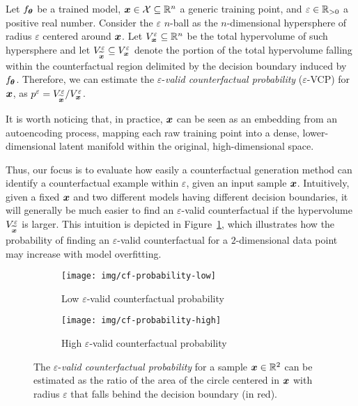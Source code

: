 \begin{definition}
Let $f_{\boldsymbol{\theta}}$ be a trained model, $\boldsymbol{x} \in \mathcal{X}\subseteq \mathbb{R}^n$ a generic training point, and $\varepsilon \in \mathbb{R}_{>0}$ a positive real number. Consider the $\varepsilon$ $n$-ball as the $n$-dimensional hypersphere of radius $\varepsilon$ centered around $\boldsymbol{x}$. Let $V_{\boldsymbol{x}}^{\varepsilon}\subseteq \mathbb{R}^n$ be the total hypervolume of such hypersphere and let $V_{\widetilde{\boldsymbol{x}}}^{\varepsilon} \subseteq V_{\boldsymbol{x}}^{\varepsilon}$ denote the portion of the total hypervolume falling within the counterfactual region delimited by the decision boundary induced by $f_{\boldsymbol{\theta}}$. Therefore, we can estimate the $\varepsilon$-\textit{valid counterfactual probability} ($\varepsilon$-VCP) for $\boldsymbol{x}$, as $p^{\varepsilon} = V_{\widetilde{\boldsymbol{x}}}^{\varepsilon}/V_{\boldsymbol{x}}^{\varepsilon}$. 
\end{definition}
It is worth noticing that, in practice, $\boldsymbol{x}$ can be seen as an embedding from an autoencoding process, mapping each raw training point into a dense, lower-dimensional latent manifold within the original, high-dimensional space. 

Thus, our focus is to evaluate how easily a counterfactual generation method can identify a counterfactual example within $\varepsilon$, given an input sample $\boldsymbol{x}$.
Intuitively, given a fixed $\boldsymbol{x}$ and two different models having different decision boundaries, it will generally be much easier to find an $\varepsilon$-valid counterfactual if the hypervolume $V_{\widetilde{\boldsymbol{x}}}^{\varepsilon}$ is larger. %
This intuition is depicted in Figure~\ref{fig:cf-probability}, which illustrates how the probability of finding an $\varepsilon$-valid counterfactual for a $2$-dimensional data point may increase with model overfitting.
 \begin{figure}
 \centering
 \begin{subfigure}[htb!]{.4\linewidth}
 \texttt{[image: img/cf-probability-low]}
 \caption{Low $\varepsilon$-valid counterfactual probability}
 \end{subfigure}
 \qquad
 \begin{subfigure}[h]{.4\linewidth}
 \texttt{[image: img/cf-probability-high]}
 \caption{High $\varepsilon$-valid counterfactual probability}
 \end{subfigure}%
 \caption{The $\varepsilon$-\textit{valid counterfactual probability} for a sample $\boldsymbol{x} \in \mathbb{R}^2$ can be estimated as the ratio of the area of the circle centered in $\boldsymbol{x}$ with radius $\varepsilon$ that falls behind the decision boundary (in red).}
 \label{fig:cf-probability}
 \end{figure}

